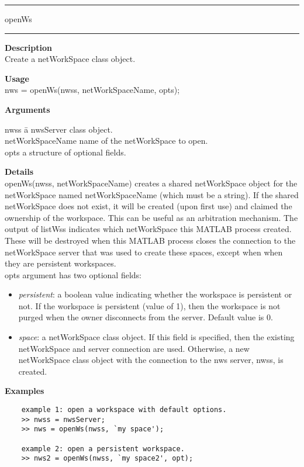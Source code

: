 \rule[0.06in]{6in}{0.01in}
\newline
openWs
\newline
\rule{6in}{0.01in}
\begin{list}{}{}
	\item {\bf Description}\\
	Create a netWorkSpace class object. 
	\item {\bf Usage}\\
	nws = openWs(nwss, netWorkSpaceName, opts);
	\item {\bf Arguments}
		\begin{tabbing}
		nwss \hspace{2.5cm} \= a nwsServer class object. \\
		netWorkSpaceName \> name of the netWorkSpace to open.\\
		opts \> a structure of optional fields.
		\end{tabbing}
	\item {\bf Details}\\
	openWs(nwss, netWorkSpaceName) creates a shared netWorkSpace object for
	the netWorkSpace named netWorkSpaceName (which must be a string). 
	If the shared netWorkSpace does not exist, it will be created (upon first use)
	and claimed the ownership of the workspace. This can be useful as an arbitration
	mechanism. The output of listWss indicates which netWorkSpace this MATLAB process
	created. These will be destroyed when this MATLAB process closes the connection
	to the netWorkSpace server that was used to create these spaces, except when 
        when they are persistent workspaces. \\

	opts argument has two optional fields: 
	\begin{itemize}
	\item \textit {persistent}: a boolean value indicating whether the workspace is persistent or not. If
	the workspace is persistent (value of 1), then the workspace is not purged
	when the owner disconnects from the server. Default value is 0.
	\item \textit {space}: a netWorkSpace class object. 
	If this field is specified, then the existing netWorkSpace and server connection are used. Otherwise, a new netWorkSpace 
    class object with the connection to the nws server, nwss, is created.
	\end{itemize}
	
	\item {\bf Examples}
	\begin{verbatim}
	example 1: open a workspace with default options.
	>> nwss = nwsServer;
	>> nws = openWs(nwss, `my space');
	
	example 2: open a persistent workspace.
	>> nws2 = openWs(nwss, `my space2', opt);
	\end{verbatim}
\end{list}

